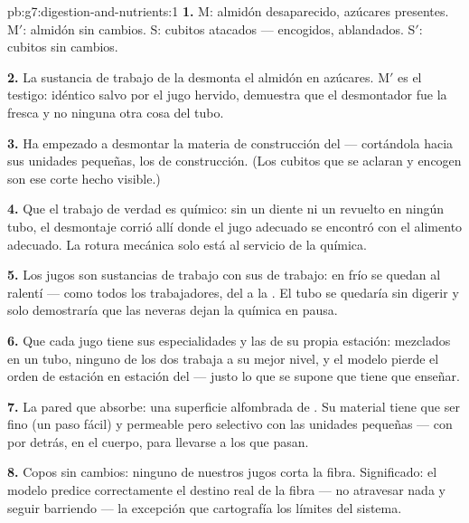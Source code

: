 \begin{solution}{pb:g7:digestion-and-nutrients:1}
\textbf{1.} M: almidón desaparecido, azúcares presentes. M$'$: almidón
sin cambios. S: cubitos atacados --- encogidos, ablandados. S$'$:
cubitos sin cambios.

\textbf{2.} La sustancia de trabajo de la  desmonta el almidón en
azúcares. M$'$ es el testigo: idéntico salvo por el jugo hervido,
demuestra que el desmontador fue la  fresca y no ninguna otra
cosa del tubo.

\textbf{3.} Ha empezado a desmontar la materia de construcción del
 --- cortándola hacia sus unidades pequeñas, los  de
construcción. (Los cubitos que se aclaran y encogen son ese corte
hecho visible.)

\textbf{4.} Que el trabajo de verdad es químico: sin un diente ni un
revuelto en ningún tubo, el desmontaje corrió allí donde el jugo
adecuado se encontró con el alimento adecuado. La rotura mecánica solo
está al servicio de la química.

\textbf{5.} Los jugos son sustancias de trabajo con sus  de
trabajo: en frío se quedan al ralentí --- como todos los trabajadores,
del  a la . El tubo se quedaría sin digerir y solo
demostraría que las neveras dejan la química en pausa.

\textbf{6.} Que cada jugo tiene sus especialidades y las  de
su propia estación: mezclados en un tubo, ninguno de los dos trabaja a
su mejor nivel, y el modelo pierde el orden de estación en estación del
 --- justo lo que se supone que tiene que enseñar.

\textbf{7.} La pared que absorbe: una superficie alfombrada de
. Su material tiene que ser fino (un paso fácil) y
permeable pero selectivo con las unidades pequeñas --- con  por detrás, en el cuerpo, para llevarse a los que pasan.

\textbf{8.} Copos sin cambios: ninguno de nuestros jugos corta la
fibra. Significado: el modelo predice correctamente el destino real de
la fibra --- no atravesar nada y seguir barriendo --- la excepción que
cartografía los límites del sistema.


\end{solution}
